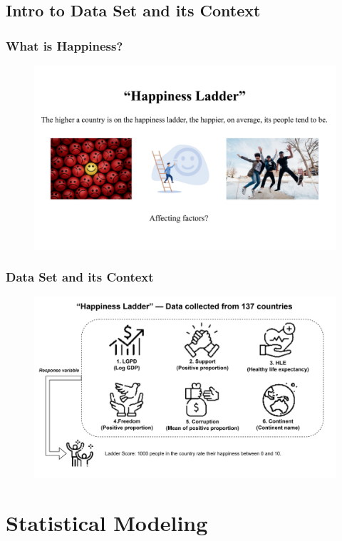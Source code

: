 \documentclass{beamer}
\begin{document}
\subsection{Intro to Data Set and its Context}
% 
% 
% 
% 
% 
% 
\begin{frame}
  \frametitle{What is Happiness?}
  \begin{figure}
    \includegraphics[width=\textwidth]{img/What is happyness.png}
  \end{figure}
\end{frame}
% 
% 
% 
% 
\begin{frame}
  \frametitle{Data Set and its Context}
  \begin{figure}
    \includegraphics[width=\textwidth]{img/Intro to Dataset.png}
  \end{figure}
\end{frame}
% 
% 
% 
% 
% 
% 
% 
% 
% 
% 
% 
% 
\section{Statistical Modeling}
% 
% 
% 
% 
\end{document}
